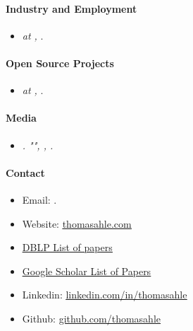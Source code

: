 \documentclass[11pt]{article}
\begin{document}
\paragraph{Industry and Employment}
\begin{itemize}
   \item[]
   \emph{ at , }.
   \\
\end{itemize}

\paragraph{Open Source Projects}
\begin{itemize}
   \item[]
   \emph{ at , }.
   \\
\end{itemize}


\paragraph{Media}
\begin{itemize}
   \item[]
      \emph{.
         "", , .}
\end{itemize}

\paragraph{Contact}
\begin{itemize}
   \item[]
      Email: \href{mailto:\VAR{authors['thdy'].email}}{}.
   \item[]
      Website: \href{http://www.thomasahle.com}{\underline{thomasahle.com}}
   \item[]
      \href{https://dblp1.uni-trier.de/pers/hd/a/Ahle:Thomas_D=}{\underline{DBLP List of papers}}
   \item[]
      \href{https://scholar.google.dk/citations?user=aRiVoYgAAAAJ}{\underline{Google Scholar List of Papers}}
   \item[]
      Linkedin: \href{https://www.linkedin.com/in/thomasahle/}{\underline{linkedin.com/in/thomasahle}}
   \item[]
      Github: \href{https://github.com/thomasahle}{\underline{github.com/thomasahle}}
\end{itemize}
\end{document}

